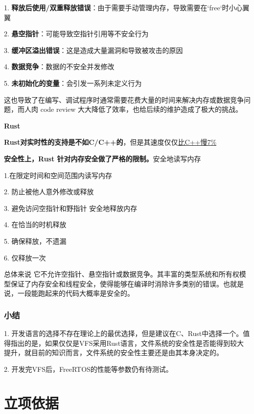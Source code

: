 \documentclass[UTF8,a4paper]{ctexart}
\begin{document}
	1.   \textbf{释放后使用/双重释放错误}：由于需要手动管理内存，导致需要在`free`时小心翼翼
	
	2. \textbf{悬空指针}：可能导致空指针引用等不安全行为
	
	3.  \textbf{缓冲区溢出错误}：这是造成大量漏洞和导致被攻击的原因
	
	4.  \textbf{数据竞争}：数据的不安全并发修改
	
	5.  \textbf{未初始化的变量}：会引发一系列未定义行为
	
	这也导致了在编写、调试程序时通常需要花费大量的时间来解决内存或数据竞争问题，而人肉 code review 大大降低了效率，也给后续的维护造成了极大的挑战。
	
	\textbf{Rust}
	
	\textbf{Rust对实时性的支持是不如C/C++的}，但是其速度仅仅\href{https://blog.famzah.net/2016/09/10/cpp-vs-python-vs-php-vs-java-vs-others-performance-benchmark-2016-q3/}{比C++慢7\%}
	
	\textbf{安全性上，Rust 针对内存安全做了严格的限制。}安全地读写内存 
	
	1.在限定时间和空间范围内读写内存
	
	2. 防止被他人意外修改或释放
	
	3. 避免访问空指针和野指针 安全地释放内存
	
	4. 在恰当的时机释放
	
	5. 确保释放，不遗漏
	
	6. 仅释放一次 
	
	总体来说 它不允许空指针、悬空指针或数据竞争。其丰富的类型系统和所有权模型保证了内存安全和线程安全，使得能够在编译时消除许多类别的错误。也就是说，一段能跑起来的代码大概率是安全的。
	\subsubsection{小结}
	1. 开发语言的选择不存在理论上的最优选择，但是建议在C、Rust中选择一个。值得指出的是，如果仅仅是VFS采用Rust语言，文件系统的安全性是否能得到较大提升，就目前的知识而言，文件系统的安全性主要还是由其本身决定的。
	
	2. 开发完VFS后，FreeRTOS的性能等参数仍有待测试。

\section{立项依据}

\end{document}
